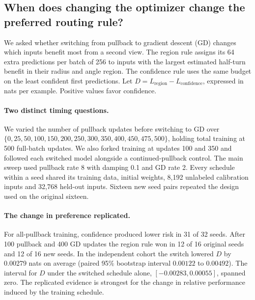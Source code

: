 \subsection{When does changing the optimizer change the preferred routing rule?}
\label{sec:switch-time}

We asked whether switching from pullback to gradient descent (GD) changes which inputs benefit most from a second view. The region rule assigns its 64 extra predictions per batch of 256 to inputs with the largest estimated half-turn benefit in their radius and angle region. The confidence rule uses the same budget on the least confident first predictions. Let \(D=L_{\mathrm{region}}-L_{\mathrm{confidence}}\), expressed in nats per example. Positive values favor confidence.

\paragraph{Two distinct timing questions.}
We varied the number of pullback updates before switching to GD over
\(\{0,25,50,100,150,200,250,300,350,400,450,475,500\}\), holding total training at 500 full-batch updates. We also forked training at updates 100 and 350 and followed each switched model alongside a continued-pullback control. The main sweep used pullback rate 8 with damping 0.1 and GD rate 2. Every schedule within a seed shared its training data, initial weights, 8,192 unlabeled calibration inputs and 32,768 held-out inputs. Sixteen new seed pairs repeated the design used on the original sixteen.

\paragraph{The change in preference replicated.}
For all-pullback training, confidence produced lower risk in 31 of 32 seeds. After 100 pullback and 400 GD updates the region rule won in 12 of 16 original seeds and 12 of 16 new seeds. In the independent cohort the switch lowered \(D\) by 0.00279 nats on average (paired 95\% bootstrap interval \(0.00122\) to \(0.00492\)). The interval for \(D\) under the switched schedule alone, \([-0.00283,0.00055]\), spanned zero. The replicated evidence is strongest for the change in relative performance induced by the training schedule.

